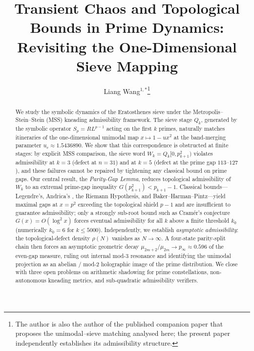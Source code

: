 \documentclass{iopjournal}
\theoremstyle{definition}
\begin{document}

\title{Transient Chaos and Topological Bounds in Prime Dynamics: Revisiting the One-Dimensional Sieve Mapping}

\author{Liang Wang$^{1,*}$\thanks{The author is also the author of
the published companion paper \cite{wang2026emergence} that proposes
the unimodal--sieve matching analysed here; the present paper
independently establishes its admissibility structure.}}





\begin{abstract}
We study the symbolic dynamics of the Eratosthenes sieve under the
Metropolis--Stein--Stein (MSS) kneading admissibility framework. The
sieve stage $Q_k$, generated by the symbolic operator $S_p = R L^{p-1}$
acting on the first $k$ primes, naturally matches itineraries of the
one-dimensional unimodal map $x \mapsto 1 - u x^2$ at the band-merging
parameter $u_c \approx 1.5436890$. We show that this correspondence is
obstructed at finite stages: by explicit MSS comparison, the sieve word
$W_k = Q_k[0, p_{k+1}^2)$ violates admissibility at $k = 3$ (defect at
$n = 31$) and at $k = 5$ (defect at the prime gap $113$--$127$), and
these failures cannot be repaired by tightening any classical bound on
prime gaps. Our central result, the \emph{Parity-Gap Lemma}, reduces
topological admissibility of $W_k$ to an extremal prime-gap inequality
$G(p_{k+1}^2) < p_{k+1} - 1$. Classical bounds---Legendre's, Andrica's
\cite{andrica1986conjecture}, the Riemann Hypothesis, and
Baker--Harman--Pintz---yield maximal gaps at $x = p^2$ exceeding the
topological shield $p - 1$ and are insufficient to guarantee
admissibility; only a strongly sub-root bound such as Cram\'er's
conjecture $G(x) = O(\log^2 x)$ forces eventual admissibility for all
$k$ above a finite threshold $k_0$ (numerically $k_0 = 6$ for
$k \leq 5000$). Independently, we establish \emph{asymptotic
admissibility}: the topological-defect density $\rho(N)$ vanishes as
$N \to \infty$. A four-state parity-split chain then forces an
asymptotic geometric decay $\mu_{2m+2}/\mu_{2m} \to p_\infty \approx 0.596$
of the even-gap measure, ruling out internal mod-3 resonance and
identifying the unimodal projection as an abelian / mod-2 holographic
image of the prime distribution. We close with three open problems on
arithmetic shadowing for prime constellations, non-autonomous kneading
metrics, and sub-quadratic admissibility verifiers.
\end{abstract}
\end{document}
